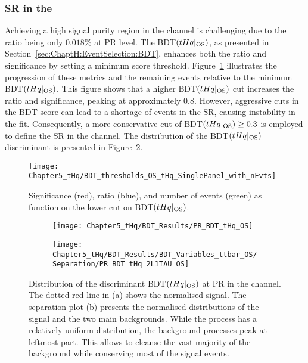 \subsubsection{SR in the \dilepOStau}
\label{sec:ChaptH:EventSelection:SR:OS}
Achieving a high signal purity region in the \dilepOStau channel is challenging due to 
the \StoB ratio being only $0.018\%$ at PR level. The BDT$(tHq|_{\text{OS}})$, as presented in 
Section~\ref{sec:ChaptH:EventSelection:BDT}, enhances both the \StoB ratio and significance 
by setting a minimum score threshold. Figure~\ref{fig:ChaptH:EventSelection:SR_OS:Significance} 
illustrates the progression of these metrics and the remaining \tHq events relative to the minimum 
BDT$(tHq|_{\text{OS}})$. This figure shows that a higher BDT$(tHq|_{\text{OS}})$ cut increases 
the \StoB ratio and significance, peaking at approximately 0.8. However, aggressive cuts in the BDT 
score can lead to a shortage of events in the SR, causing instability in the fit. Consequently, a more 
conservative cut of  BDT$(tHq|_{\text{OS}})\geq 0.3$ is employed to define the SR in the \dilepOStau 
channel.
The distribution of the BDT$(tHq|_{\text{OS}})$ discriminant is presented in
Figure~\ref{fig:ChaptH:EventSelection:SR:OS:BDT_score_distribution}.

\begin{figure}[h]
\centering
  \texttt{[image: Chapter5\_tHq/BDT\_thresholds\_OS\_tHq\_SinglePanel\_with\_nEvts]}
\caption{Significance (red), \StoB ratio (blue), and number of \tHq events (green) as function on the lower cut on BDT$(tHq|_{\text{OS}})$.}
\label{fig:ChaptH:EventSelection:SR_OS:Significance}
\end{figure}

\begin{figure}[h]
\centering
\begin{subfigure}{.45\textwidth}
  \centering
  \texttt{[image: Chapter5\_tHq/BDT\_Results/PR\_BDT\_tHq\_OS]}
  \caption{}
\end{subfigure}%
\begin{subfigure}{.5 \textwidth}
  \centering
  \texttt{[image: Chapter5\_tHq/BDT\_Results/BDT\_Variables\_ttbar\_OS/Separation/PR\_BDT\_tHq\_2L1TAU\_OS]}
  \caption{}
\end{subfigure}
\caption{Distribution of the discriminant BDT$(tHq|_{\text{OS}})$ at PR in the \dilepOStau channel.
The dotted-red line in (a) shows the normalised \tHq signal.
The separation plot (b) presents the normalised distributions of the \tHq signal and the two main backgrounds.
While the \tHq process has a relatively uniform distribution, the background processes peak at leftmost
part. This allows to cleanse the vast majority of the background while conserving most of the signal events.}
\label{fig:ChaptH:EventSelection:SR:OS:BDT_score_distribution}
\end{figure}



